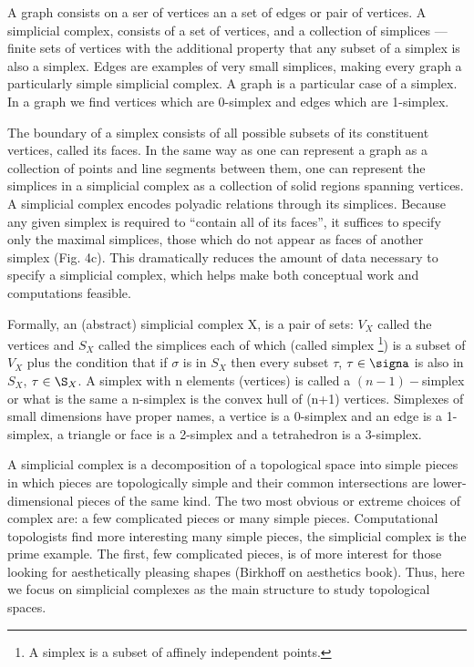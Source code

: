 \documentclass[onecollarge,runningheads]{svjour2}
\begin{document}
A graph consists on a ser of vertices an a set of edges or pair of vertices. A simplicial complex, consists of a set of vertices, and a collection of simplices — finite sets of vertices with the additional property that any subset of a simplex is also a simplex.
Edges are examples of very small simplices, making every graph a particularly simple simplicial complex. A graph is a particular case of a simplex. In a graph we find vertices  which are 0-simplex and edges which are 1-simplex.

The boundary of a simplex consists of all possible subsets of its constituent vertices, called its faces. In the same way as one can represent a graph as a collection of points and line segments between them, one can represent the simplices in a simplicial complex as a collection of solid regions spanning vertices.
A simplicial complex encodes polyadic relations through its simplices.
Because any given simplex is required to “contain all of its faces”, it suffices to specify only the maximal simplices, those which do not appear as faces of another simplex (Fig. 4c). This dramatically reduces the amount of data necessary to specify a simplicial complex, which helps make both conceptual work and computations feasible.

Formally, an (abstract) simplicial complex X, is a pair of sets: $V_X$ called the vertices and $S_X$ called the simplices each of which (called simplex \footnote{A simplex is a subset of affinely independent points.}) is a subset of $V_X$ plus the condition that if $\sigma$ is in $S_X$ then every subset $\tau$, $\tau \in \signa$ is also in $S_X$, $\tau \in \S_X$.
A simplex with n elements (vertices) is called a $(n-1)-$simplex or what is the same a n-simplex is the convex hull of (n+1) vertices. Simplexes of small dimensions have proper names, a vertice is a 0-simplex and an edge is a 1-simplex, a triangle or face is a 2-simplex and a tetrahedron is a 3-simplex. 


A simplicial complex is a decomposition of a topological space into simple pieces in which pieces are topologically simple and their common intersections are lower-dimensional pieces of the same kind. The two most obvious or extreme choices of complex are: a few complicated pieces or many simple pieces. Computational topologists find more interesting many simple pieces, the simplicial complex is the prime example. The first, few complicated pieces, is of more interest for those looking for aesthetically pleasing shapes (Birkhoff on aesthetics book).
Thus, here we focus on simplicial complexes as the main structure to study topological spaces. 
\end{document}
